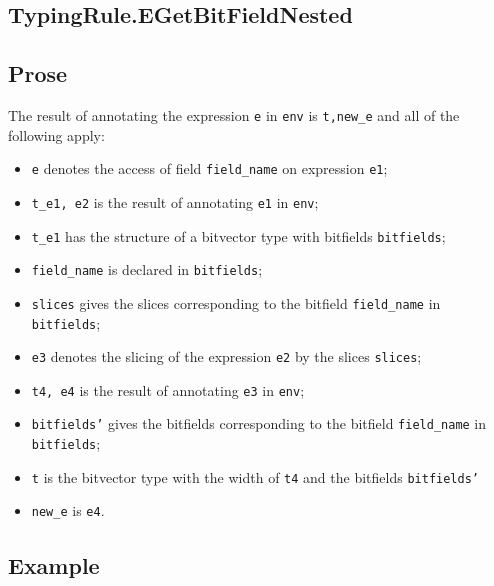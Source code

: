 \documentclass{book}
\begin{document}
\begin{itemize}

\section{TypingRule.EGetBitFieldNested \label{sec:TypingRule.EGetBitFieldNested}}

  \subsection{Prose}
  The result of annotating the expression \texttt{e} in \texttt{env} is
\texttt{t,new\_e} and all of the following apply:
  \begin{itemize}
  \item \texttt{e} denotes the access of field \texttt{field\_name} on expression \texttt{e1};
  \item \texttt{t\_e1, e2} is the result of annotating \texttt{e1} in \texttt{env};
  \item \texttt{t\_e1} has the structure of a bitvector type with bitfields \texttt{bitfields};
  \item \texttt{field\_name} is declared in \texttt{bitfields};
  \item \texttt{slices} gives the slices corresponding to the bitfield \texttt{field\_name} in \\
    \texttt{bitfields};
  \item \texttt{e3} denotes the slicing of the expression \texttt{e2} by the slices \texttt{slices};
  \item \texttt{t4, e4} is the result of annotating \texttt{e3} in \texttt{env};
  \item \texttt{bitfields'} gives the bitfields corresponding to the bitfield \texttt{field\_name}
    in \texttt{bitfields};
  \item \texttt{t} is the bitvector type with the width of \texttt{t4} and the bitfields \texttt{bitfields'}
  \item \texttt{new\_e} is \texttt{e4}.
  \end{itemize}

  \subsection{Example}




\end{itemize}
\end{document}
